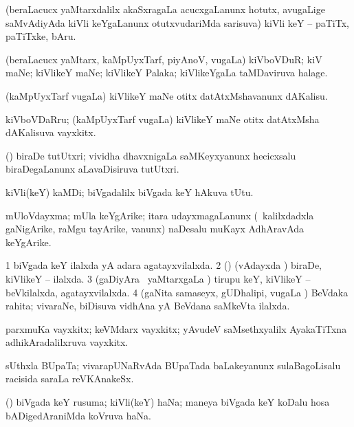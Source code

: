 \bentry
{}
\gl{\nA}
\bmng
(beraLacucx yaMtarxdalilx akaSxragaLa acucxgaLanunx hotutx, avugaLige saMvAdiyAda kiVli keYgaLanunx otutxvudariMda sarisuva) kiVli keY -- paTiTx, paTiTxke, bAru. 
\emng
\eentry

\bentry
{}
\gl{\nA}
\bmng
(beraLacucx yaMtarx, kaMpUyxTarf, piyAnoV, \mo vugaLa) kiVboVDuR; kiV maNe; kiVlikeY maNe; kiVlikeY Palaka; kiVlikeYgaLa taMDaviruva halage. 
\emng
\eentry

\bentry
{}
\gl{\sakirx}
\bmng
(kaMpUyxTarf \mo vugaLa) kiVlikeY maNe otitx datAtxMshavanunx dAKalisu. 
\emng
\eentry

\bentry
{}
\gl{\nA}
\bmng
kiVboVDaRru; (kaMpUyxTarf \mo vugaLa) kiVlikeY maNe otitx datAtxMsha dAKalisuva vayxkitx. 
\emng
\eentry

\bentry
{}
\gl{\nA}
\bmng
(\ca) biraDe tutUtxri; vividha dhavxnigaLa saMKeyxyanunx hecicxsalu biraDegaLanunx aLavaDisiruva tutUtxri. 
\emng
\eentry

\bentry
{}
\gl{\nA}
\bmng
kiVli(keY) kaMDi; biVgadalilx biVgada keY hAkuva tUtu. 
\emng
\eentry

\bentry
{}
\gl{\nA}
\bmng
mUloVdayxma; mUla keYgArike; itara udayxmagaLanunx (\udA\ kalilxdadxla gaNigArike, raMgu tayArike, \mo vanunx) naDesalu muKayx AdhAravAda keYgArike. 
\emng
\eentry

\bentry
{}
\gl{\gu}
\bmng
\bnum
\num{1} biVgada keY ilalxda yA adara agatayxvilalxda. 
\num{2} (\saM) (vAdayxda \vi) biraDe, kiVlikeY -- ilalxda. 
\num{3} (gaDiyAra \mo\ yaMtarxgaLa \vi) tirupu keY, kiVlikeY -- beVkilalxda, agatayxvilalxda. 
\num{4} (gaNita samaseyx, gUDhalipi, \mo vugaLa \vi) BeVdaka rahita; vivaraNe, biDisuva vidhAna yA BeVdana saMkeVta ilalxda. 
\enum
\emng
\eentry

\bentry
{}
\gl{\nA}
\bmng
parxmuKa vayxkitx; keVMdarx vayxkitx; yAvudeV saMsethxyalilx AyakaTiTxna adhikAradalilxruva vayxkitx. 
\emng
\eentry

\bentry
{}
\gl{\nA}
\bmng
sUthxla BUpaTa; vivarapUNaRvAda BUpaTada baLakeyanunx sulaBagoLisalu racisida saraLa reVKAnakeSx. 
\emng
\eentry

\bentry
{}
\gl{\nA}
\bmng
(\birx) biVgada keY rusuma; kiVli(keY) haNa; maneya biVgada keY koDalu hosa bADigedAraniMda koVruva haNa. 
\emng
\eentry

